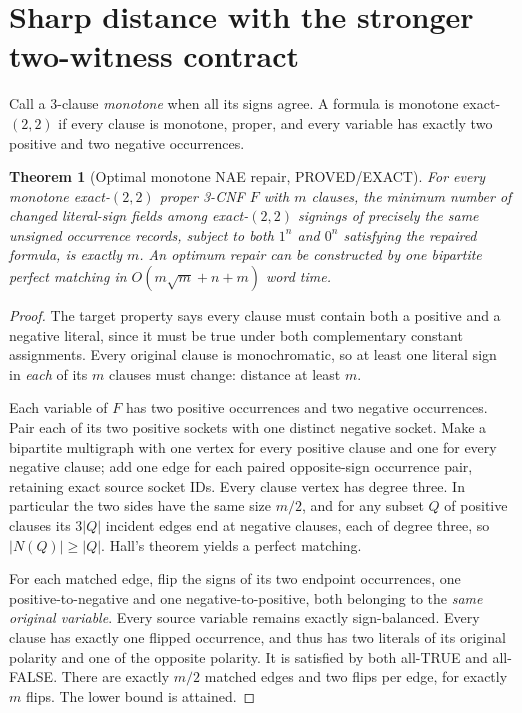 \documentclass[11pt]{article}
\newtheorem{theorem}{Theorem}
\begin{document}
\section{Sharp distance with the stronger two-witness contract}
Call a 3-clause \emph{monotone} when all its signs agree. A formula is monotone exact-$(2,2)$ if every clause is monotone, proper, and every variable has exactly two positive and two negative occurrences.

\begin{theorem}[Optimal monotone NAE repair, PROVED/EXACT]
For every monotone exact-$(2,2)$ proper 3-CNF \(F\) with \(m\) clauses, the minimum number of changed literal-sign fields among exact-$(2,2)$ signings of precisely the same unsigned occurrence records, subject to \emph{both} \(1^n\) and \(0^n\) satisfying the repaired formula, is exactly \(m\).
An optimum repair can be constructed by one bipartite perfect matching in \(O(m\sqrt m+n+m)\) word time.
\end{theorem}

\begin{proof}
The target property says every clause must contain both a positive and a negative literal, since it must be true under both complementary constant assignments. Every original clause is monochromatic, so at least one literal sign in \emph{each} of its \(m\) clauses must change: distance at least \(m\).

Each variable of \(F\) has two positive occurrences and two negative occurrences. Pair each of its two positive sockets with one distinct negative socket. Make a bipartite multigraph with one vertex for every positive clause and one for every negative clause; add one edge for each paired opposite-sign occurrence pair, retaining exact source socket IDs. Every clause vertex has degree three. In particular the two sides have the same size \(m/2\), and for any subset \(Q\) of positive clauses its \(3|Q|\) incident edges end at negative clauses, each of degree three, so \(|N(Q)|\ge|Q|\). Hall's theorem yields a perfect matching.

For each matched edge, flip the signs of its two endpoint occurrences, one positive-to-negative and one negative-to-positive, both belonging to the \emph{same original variable}. Every source variable remains exactly sign-balanced. Every clause has exactly one flipped occurrence, and thus has two literals of its original polarity and one of the opposite polarity. It is satisfied by both all-TRUE and all-FALSE. There are exactly \(m/2\) matched edges and two flips per edge, for exactly \(m\) flips. The lower bound is attained.
\end{proof}
\end{document}
